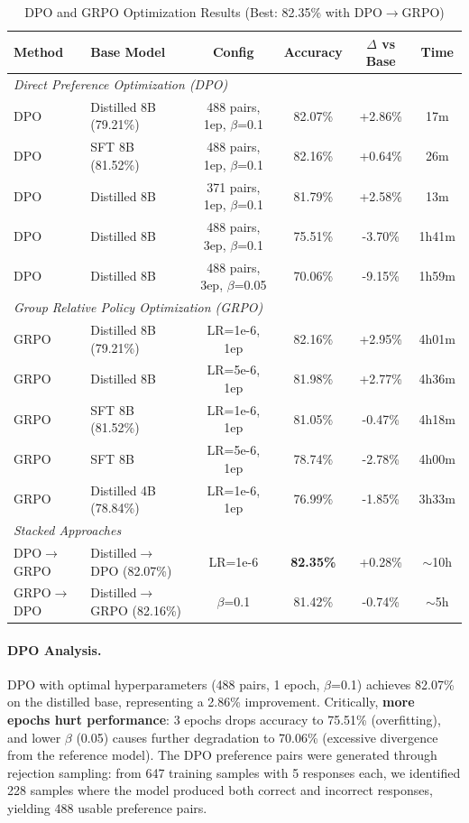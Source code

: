 \documentclass[11pt,a4paper]{article}
\begin{document}
\begin{table}[h]
\centering
\caption{DPO and GRPO Optimization Results (Best: 82.35\% with DPO$\rightarrow$GRPO)}
\label{tab:optimization_results}
\begin{tabular}{llcccc}
\toprule
\textbf{Method} & \textbf{Base Model} & \textbf{Config} & \textbf{Accuracy} & \textbf{$\Delta$ vs Base} & \textbf{Time} \\
\midrule
\multicolumn{6}{l}{\textit{Direct Preference Optimization (DPO)}} \\
DPO & Distilled 8B (79.21\%) & 488 pairs, 1ep, $\beta$=0.1 & 82.07\% & +2.86\% & 17m \\
DPO & SFT 8B (81.52\%) & 488 pairs, 1ep, $\beta$=0.1 & 82.16\% & +0.64\% & 26m \\
DPO & Distilled 8B & 371 pairs, 1ep, $\beta$=0.1 & 81.79\% & +2.58\% & 13m \\
DPO & Distilled 8B & 488 pairs, 3ep, $\beta$=0.1 & 75.51\% & -3.70\% & 1h41m \\
DPO & Distilled 8B & 488 pairs, 3ep, $\beta$=0.05 & 70.06\% & -9.15\% & 1h59m \\
\midrule
\multicolumn{6}{l}{\textit{Group Relative Policy Optimization (GRPO)}} \\
GRPO & Distilled 8B (79.21\%) & LR=1e-6, 1ep & 82.16\% & +2.95\% & 4h01m \\
GRPO & Distilled 8B & LR=5e-6, 1ep & 81.98\% & +2.77\% & 4h36m \\
GRPO & SFT 8B (81.52\%) & LR=1e-6, 1ep & 81.05\% & -0.47\% & 4h18m \\
GRPO & SFT 8B & LR=5e-6, 1ep & 78.74\% & -2.78\% & 4h00m \\
GRPO & Distilled 4B (78.84\%) & LR=1e-6, 1ep & 76.99\% & -1.85\% & 3h33m \\
\midrule
\multicolumn{6}{l}{\textit{Stacked Approaches}} \\
DPO$\rightarrow$GRPO & Distilled$\rightarrow$DPO (82.07\%) & LR=1e-6 & \textbf{82.35\%} & +0.28\% & $\sim$10h \\
GRPO$\rightarrow$DPO & Distilled$\rightarrow$GRPO (82.16\%) & $\beta$=0.1 & 81.42\% & -0.74\% & $\sim$5h \\
\bottomrule
\end{tabular}
\end{table}

\paragraph{DPO Analysis.} DPO with optimal hyperparameters (488 pairs, 1 epoch, $\beta$=0.1) achieves 82.07\% on the distilled base, representing a 2.86\% improvement. Critically, \textbf{more epochs hurt performance}: 3 epochs drops accuracy to 75.51\% (overfitting), and lower $\beta$ (0.05) causes further degradation to 70.06\% (excessive divergence from the reference model). The DPO preference pairs were generated through rejection sampling: from 647 training samples with 5 responses each, we identified 228 samples where the model produced both correct and incorrect responses, yielding 488 usable preference pairs.
\end{document}
